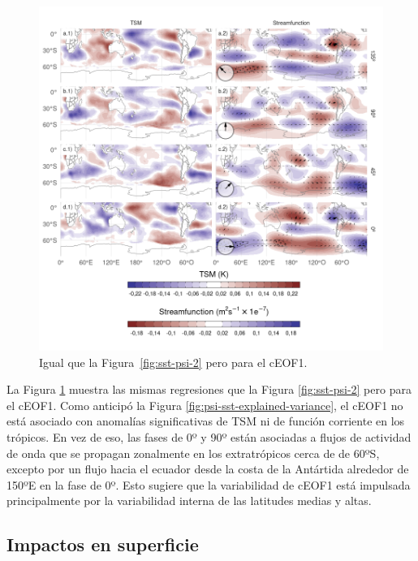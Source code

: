 \documentclass[12pt,oneside,a4paper]{reedthesis}
\begin{document}
\begin{figure}

{\centering \includegraphics{figures/20-ceofs/sst-psi-1-1} 

}

\caption{Igual que la Figura~\ref{fig:sst-psi-2} pero para el cEOF1.}\label{fig:sst-psi-1}
\end{figure}

La Figura \ref{fig:sst-psi-1} muestra las mismas regresiones que la Figura \ref{fig:sst-psi-2} pero para el cEOF1.
Como anticipó la Figura \ref{fig:psi-sst-explained-variance}, el cEOF1 no está asociado con anomalías significativas de TSM ni de función corriente en los trópicos.
En vez de eso, las fases de 0º y 90º están asociadas a flujos de actividad de onda que se propagan zonalmente en los extratrópicos cerca de de 60ºS, excepto por un flujo hacia el ecuador desde la costa de la Antártida alrededor de 150ºE en la fase de 0º.
Esto sugiere que la variabilidad de cEOF1 está impulsada principalmente por la variabilidad interna de las latitudes medias y altas.

\hypertarget{impactos}{%
\subsection{Impactos en superficie}\label{impactos}}
\end{document}
